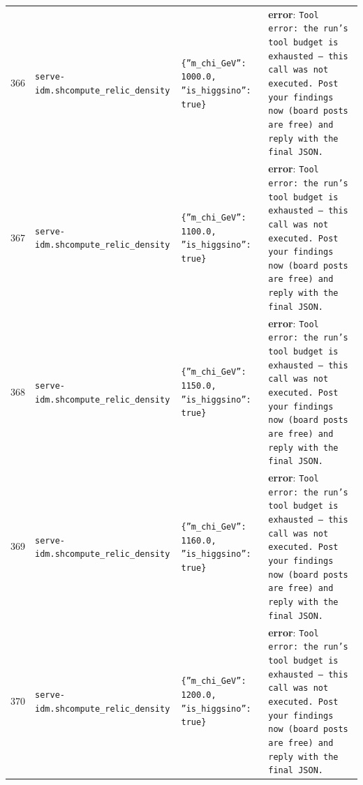 \documentclass[11pt,a4paper]{article}
\begin{document}
\begin{longtable}{@{}p{}p{}p{}p{}@{}}
366 & \texttt{serve-idm.sh}\newline\texttt{compute\_\allowbreak{}relic\_\allowbreak{}density} & \texttt{\{''m\_\allowbreak{}chi\_\allowbreak{}GeV'':\allowbreak{} 1000.0,\allowbreak{} ''is\_\allowbreak{}higgsino'':\allowbreak{} true\}\allowbreak{}} & \textbf{error}: \texttt{Tool error:\allowbreak{} the run's tool budget is exhausted --- this call was not executed. Post your findings now (board posts are free)\allowbreak{} and reply with the final JSON.} \\
367 & \texttt{serve-idm.sh}\newline\texttt{compute\_\allowbreak{}relic\_\allowbreak{}density} & \texttt{\{''m\_\allowbreak{}chi\_\allowbreak{}GeV'':\allowbreak{} 1100.0,\allowbreak{} ''is\_\allowbreak{}higgsino'':\allowbreak{} true\}\allowbreak{}} & \textbf{error}: \texttt{Tool error:\allowbreak{} the run's tool budget is exhausted --- this call was not executed. Post your findings now (board posts are free)\allowbreak{} and reply with the final JSON.} \\
368 & \texttt{serve-idm.sh}\newline\texttt{compute\_\allowbreak{}relic\_\allowbreak{}density} & \texttt{\{''m\_\allowbreak{}chi\_\allowbreak{}GeV'':\allowbreak{} 1150.0,\allowbreak{} ''is\_\allowbreak{}higgsino'':\allowbreak{} true\}\allowbreak{}} & \textbf{error}: \texttt{Tool error:\allowbreak{} the run's tool budget is exhausted --- this call was not executed. Post your findings now (board posts are free)\allowbreak{} and reply with the final JSON.} \\
369 & \texttt{serve-idm.sh}\newline\texttt{compute\_\allowbreak{}relic\_\allowbreak{}density} & \texttt{\{''m\_\allowbreak{}chi\_\allowbreak{}GeV'':\allowbreak{} 1160.0,\allowbreak{} ''is\_\allowbreak{}higgsino'':\allowbreak{} true\}\allowbreak{}} & \textbf{error}: \texttt{Tool error:\allowbreak{} the run's tool budget is exhausted --- this call was not executed. Post your findings now (board posts are free)\allowbreak{} and reply with the final JSON.} \\
370 & \texttt{serve-idm.sh}\newline\texttt{compute\_\allowbreak{}relic\_\allowbreak{}density} & \texttt{\{''m\_\allowbreak{}chi\_\allowbreak{}GeV'':\allowbreak{} 1200.0,\allowbreak{} ''is\_\allowbreak{}higgsino'':\allowbreak{} true\}\allowbreak{}} & \textbf{error}: \texttt{Tool error:\allowbreak{} the run's tool budget is exhausted --- this call was not executed. Post your findings now (board posts are free)\allowbreak{} and reply with the final JSON.} \\

\end{longtable}
\end{document}
